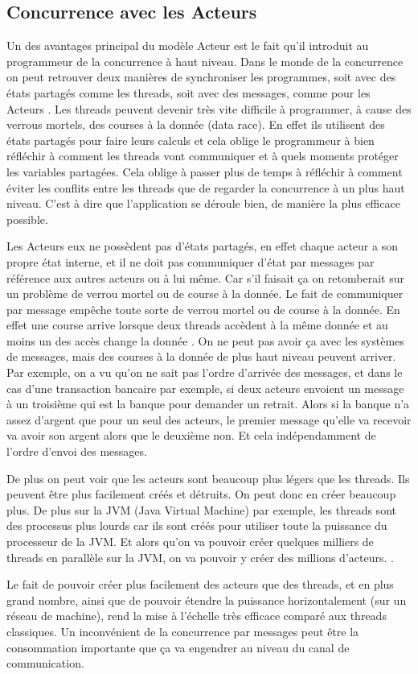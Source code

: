 \documentclass[11pt, a4paper]{article}
\begin{document}
\subsection{Concurrence avec les Acteurs}
Un des avantages principal du modèle Acteur est le fait qu'il introduit au programmeur de la concurrence à haut niveau. Dans le monde de la concurrence on peut retrouver deux manières de synchroniser les programmes, soit avec des états partagés comme les threads, soit avec des messages, comme pour les Acteurs \cite{haller2012actors}. Les threads peuvent devenir très vite difficile à programmer, à cause des verrous mortels, des courses à la donnée (data race). En effet ils utilisent des états partagés pour faire leurs calculs et cela oblige le programmeur à bien réfléchir à comment les threads vont communiquer et à quels moments protéger les variables partagées. Cela oblige à passer plus de temps à réfléchir à comment éviter les conflits entre les threads que de regarder la concurrence à un plus haut niveau. C'est à dire que l'application se déroule bien, de manière la plus efficace possible.

\par Les Acteurs eux ne possèdent pas d'états partagés, en effet chaque acteur a son propre état interne, et il ne doit pas communiquer d'état par messages par référence aux autres acteurs ou à lui même. Car s'il faisait ça on retomberait sur un problème de verrou mortel ou de course à la donnée. Le fait de communiquer par message empêche toute sorte de verrou mortel ou de course à la donnée. En effet une course arrive lorsque deux threads accèdent à la même donnée et au moins un des accès change la donnée \cite{haller2012actors}. On ne peut pas avoir ça avec les systèmes de messages, mais des courses à la donnée de plus haut niveau peuvent arriver. Par exemple, on a vu qu'on ne sait pas l'ordre d'arrivée des messages, et dans le cas d'une transaction bancaire par exemple, si deux acteurs envoient un message à un troisième qui est la banque pour demander un retrait. Alors si la banque n'a assez d'argent que pour un seul des acteurs, le premier message qu'elle va recevoir va avoir son argent alors que le deuxième non. Et cela indépendamment de l'ordre d'envoi des messages. 

\par De plus on peut voir que les acteurs sont beaucoup plus légers que les threads. Ils peuvent être plus facilement créés et détruits. On peut donc en créer beaucoup plus. De plus sur la JVM (Java Virtual Machine) par exemple, les threads sont des processus plus lourds car ils sont créés pour utiliser toute la puissance du processeur de la JVM. Et alors qu'on va pouvoir créer quelques milliers de threads en parallèle sur la JVM, on va pouvoir y créer des millions d'acteurs. \cite{haller2012actors}.
\par Le fait de pouvoir créer plus facilement des acteurs que des threads, et en plus grand nombre, ainsi que de pouvoir étendre la puissance horizontalement (sur un réseau de machine), rend la mise à l'échelle très efficace comparé aux threads classiques. Un inconvénient de la concurrence par messages peut être la consommation importante que ça va engendrer au niveau du canal de communication.
\end{document}
